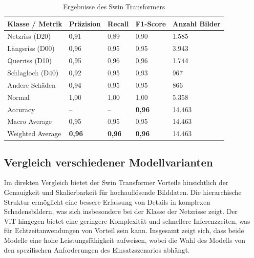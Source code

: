 \begin{table}[H]
    \centering
    \caption{Ergebnisse des Swin Transformers}
    \label{tab:results_swin}
    \begin{tabularx}{\textwidth}{lXXXX}
        \toprule
        \textbf{Klasse / Metrik} & \textbf{Präzision} & \textbf{Recall} & \textbf{F1-Score} & \textbf{Anzahl Bilder} \\
        \midrule
        Netzriss (D20)           & 0,91                & 0,89            & 0,90               & 1.585                            \\
        Längsriss (D00)          & 0,96                & 0,95            & 0,95               & 3.943                            \\
        Querriss (D10)           & 0,95                & 0,96            & 0,96               & 1.744                            \\
        Schlagloch (D40)         & 0,92                & 0,95            & 0,93               & 967                              \\
        Andere Schäden           & 0,94                & 0,95            & 0,95               & 866                              \\
        Normal                   & 1,00                & 1,00            & 1,00               & 5.358                            \\
        \midrule
        Accuracy                 & --                  & --              & \textbf{0,96}      & 14.463                           \\
        Macro Average            & 0,95                & 0,95            & 0,95               & 14.463                           \\
        Weighted Average         & \textbf{0,96}       & \textbf{0,96}   & \textbf{0,96}      & 14.463                           \\
        \bottomrule
    \end{tabularx}
\end{table}

\subsection{Vergleich verschiedener Modellvarianten}
\label{subsec:vergleich_modelle}

Im direkten Vergleich bietet der Swin Transformer Vorteile hinsichtlich der Genauigkeit und Skalierbarkeit für hochauflösende Bilddaten. Die hierarchische Struktur ermöglicht eine bessere Erfassung von Details in komplexen Schadensbildern, was sich insbesondere bei der Klasse der Netzrisse zeigt. Der ViT hingegen bietet eine geringere Komplexität und schnellere Inferenzzeiten, was für Echtzeitanwendungen von Vorteil sein kann. Insgesamt zeigt sich, dass beide Modelle eine hohe Leistungsfähigkeit aufweisen, wobei die Wahl des Modells von den spezifischen Anforderungen des Einsatzszenarios abhängt.

